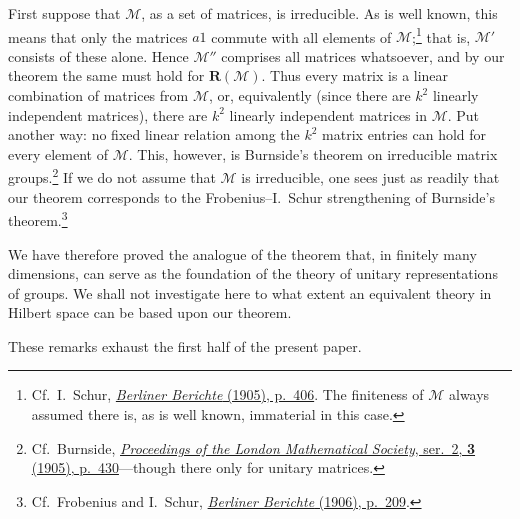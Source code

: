 \documentclass[
  paper=b5,
  twoside=true,
  fontsize=13pt,
  headings=normal,
  bookmarkpackage=false
]{scrartcl}
\theoremstyle{definition}
\newcommand{\GeneratedRing}{\boldsymbol{R}}
\begin{document}
First suppose that $\mathcal M$, as a set of matrices, is irreducible. As
is well known, this means that only the matrices $a1$ commute with all
elements of $\mathcal M$;\footnote{\label{fn:18}Cf.\ I.~Schur, \href{https://archive.org/details/sitzungsberichte1905deutsch}{\emph{Berliner Berichte} (1905), p.~406}. The finiteness of $\mathcal M$ always assumed there is, as
is well known, immaterial in this case.} that is, $\mathcal M'$ consists
of these alone. Hence $\mathcal M''$ comprises all matrices whatsoever,
and by our theorem the same must hold for $\GeneratedRing (\mathcal M)$. Thus every
matrix is a linear combination of matrices from $\mathcal M$, or,
equivalently (since there are $k^2$ linearly independent matrices), there
are $k^2$ linearly independent matrices in $\mathcal M$. Put another way:
no fixed linear relation among the $k^2$ matrix entries can hold for every
element of $\mathcal M$. This, however, is Burnside's theorem on
irreducible matrix groups.\footnote{\label{fn:19}Cf.\ Burnside, \href{https://doi.org/10.1112/plms/s2-3.1.430}{\emph{Proceedings of the
London Mathematical Society}, ser.~2, \textbf{3} (1905), p.~430}---though
there only for unitary matrices.} If we do not assume that $\mathcal M$
is irreducible, one sees just as readily that our theorem corresponds to
the Frobenius--I.~Schur strengthening of Burnside's
theorem.\footnote{\label{fn:20}Cf.\ Frobenius and I.~Schur, \href{https://upload.wikimedia.org/wikipedia/commons/c/cb/Sitzungsberichte_der_K\%C3\%B6niglich_Preussischen_Akademie_der_Wissenschaften_zu_Berlin_\%28IA_sitzungsberichte1906deut\%29.pdf}{\emph{Berliner Berichte} (1906), p.~209}.}

We have therefore proved the analogue of the theorem that, in finitely many
dimensions, can serve as the foundation of the theory of unitary
representations of groups. We shall not investigate here to what extent an
equivalent theory in Hilbert space can be based upon our theorem.

These remarks exhaust the first half of the present paper.
\end{document}

